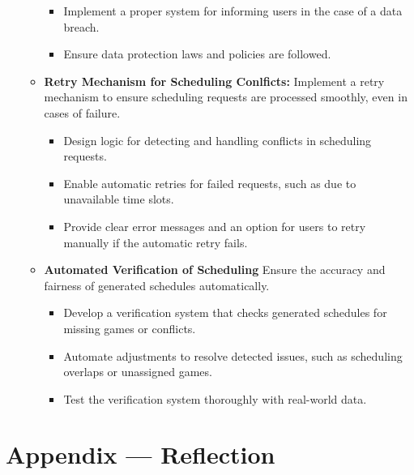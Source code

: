 \documentclass{article}
\begin{document}
\begin{enumerate}
\begin{itemize}
\begin{itemize}
				\item Implement a proper system for informing users in the case of a data breach.
				\item Ensure data protection laws and policies are followed.
			\end{itemize}
            \item \textbf{Retry Mechanism for Scheduling Conlficts:} Implement a retry mechanism to ensure scheduling requests are processed smoothly, even in cases of failure.
			\begin{itemize}
				\item Design logic for detecting and handling conflicts in scheduling requests.
				\item Enable automatic retries for failed requests, such as due to unavailable time slots.
				\item Provide clear error messages and an option for users to retry manually if the automatic retry fails.
			\end{itemize}
            \item \textbf{Automated Verification of Scheduling} Ensure the accuracy and fairness of generated schedules automatically.
			\begin{itemize}
				\item Develop a verification system that checks generated schedules for missing games or conflicts.
				\item Automate adjustments to resolve detected issues, such as scheduling overlaps or unassigned games.
				\item Test the verification system thoroughly with real-world data.
			\end{itemize}

		\end{itemize}
\end{enumerate}

\newpage{}

\section*{Appendix --- Reflection}


\end{document}
